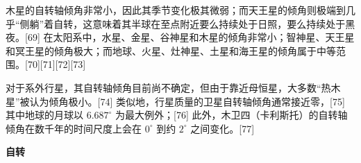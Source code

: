 木星的自转轴倾角非常小，因此其季节变化极其微弱；而天王星的倾角则极端到几乎“侧躺”着自转，这意味着其半球在至点附近要么持续处于日照，要么持续处于黑夜。[69] 在太阳系中，水星、金星、谷神星和木星的倾角非常小；智神星、天王星和冥王星的倾角极大；而地球、火星、灶神星、土星和海王星的倾角属于中等范围。[70][71][72][73]

对于系外行星，其自转轴倾角目前尚不确定，但由于靠近母恒星，大多数“热木星”被认为倾角极小。[74] 类似地，行星质量的卫星自转轴倾角通常接近零，[75] 其中地球的月球以 $6.687^\circ$ 为最大例外；[76] 此外，木卫四（卡利斯托）的自转轴倾角在数千年的时间尺度上会在 $0^\circ$ 到约 $2^\circ$ 之间变化。[77]

\textbf{自转}
